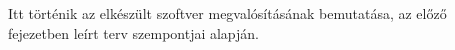 
Itt történik az elkészült szoftver megvalósításának bemutatása, az előző fejezetben leírt terv szempontjai alapján.

